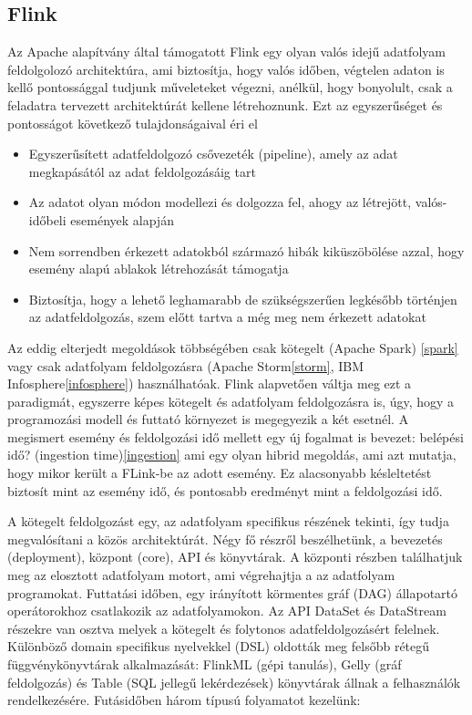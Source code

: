 \documentclass[a4paper,12pt]{article}
\begin{document}
\subsection{Flink}
Az Apache alapítvány által támogatott Flink egy olyan valós idejű adatfolyam feldolgolozó architektúra, ami biztosítja, hogy valós időben, végtelen adaton is kellő pontossággal tudjunk műveleteket végezni, anélkül, hogy bonyolult, csak a feladatra tervezett architektúrát kellene létrehoznunk. Ezt az egyszerűséget és pontosságot következő tulajdonságaival éri el ~\cite{flink}
\begin{itemize}
\item Egyszerűsített adatfeldolgozó csővezeték (pipeline), amely az adat megkapásától az adat feldolgozásáig tart
\item Az adatot olyan módon modellezi és dolgozza fel, ahogy az létrejött, valós-időbeli események alapján
\item Nem sorrendben érkezett adatokból származó hibák kiküszöbölése azzal, hogy esemény alapú ablakok létrehozását támogatja
\item Biztosítja, hogy a lehető leghamarabb de szükségszerűen legkésőbb történjen az adatfeldolgozás, szem előtt tartva a még meg nem érkezett adatokat
\end{itemize}

Az eddig elterjedt megoldások többségében csak kötegelt (Apache Spark) \ref{spark} vagy csak adatfolyam feldolgozásra (Apache Storm\ref{storm}, IBM Infosphere\ref{infosphere}) használhatóak. Flink alapvetően váltja meg ezt a paradigmát, egyszerre képes kötegelt és adatfolyam feldolgozásra is, úgy, hogy a programozási modell és futtató környezet is megegyezik a két esetnél. A megismert esemény és feldolgozási idő mellett egy új fogalmat is bevezet: belépési idő? (ingestion time)\ref{ingestion} ami egy olyan hibrid megoldás, ami azt mutatja, hogy mikor került a FLink-be az adott esemény.
Ez alacsonyabb késleltetést biztosít mint az esemény idő, és pontosabb eredményt mint a feldolgozási idő. \linebreak

A kötegelt feldolgozást egy, az adatfolyam specifikus részének tekinti, így tudja megvalósítani a közös architektúrát. Négy fő részről beszélhetünk, a bevezetés (deployment), központ (core), API és könyvtárak. A központi részben találhatjuk meg az elosztott adatfolyam motort, ami végrehajtja a az adatfolyam programokat. Futtatási időben, egy irányított körmentes gráf (DAG) állapotartó operátorokhoz csatlakozik az adatfolyamokon. Az API DataSet és DataStream részekre van osztva melyek a kötegelt és folytonos adatfeldolgozásért felelnek. Különböző domain specifikus nyelvekkel (DSL) oldották meg felsőbb rétegű függvénykönyvtárak alkalmazását: FlinkML (gépi tanulás), Gelly (gráf feldolgozás) és Table (SQL jellegű lekérdezések) könyvtárak állnak a felhasználók rendelkezésére.  Futásidőben három típusú folyamatot kezelünk:
 
\end{document}
